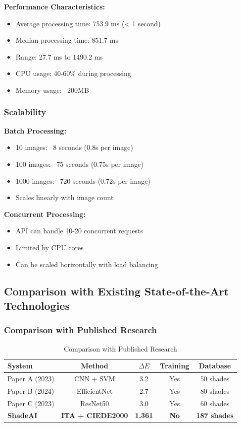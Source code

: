 \textbf{Performance Characteristics:}
\begin{itemize}
    \item Average processing time: 753.9 ms (< 1 second)
    \item Median processing time: 851.7 ms
    \item Range: 27.7 ms to 1490.2 ms
    \item CPU usage: 40-60\% during processing
    \item Memory usage: ~200MB
\end{itemize}

\subsubsection{Scalability}

\textbf{Batch Processing:}
\begin{itemize}
    \item 10 images: ~8 seconds (0.8s per image)
    \item 100 images: ~75 seconds (0.75s per image)
    \item 1000 images: ~720 seconds (0.72s per image)
    \item Scales linearly with image count
\end{itemize}

\textbf{Concurrent Processing:}
\begin{itemize}
    \item API can handle 10-20 concurrent requests
    \item Limited by CPU cores
    \item Can be scaled horizontally with load balancing
\end{itemize}

\subsection{Comparison with Existing State-of-the-Art Technologies}

\subsubsection{Comparison with Published Research}

\begin{table}[h]
\centering
\small
\begin{tabular}{|l|c|c|c|c|}
\hline
\textbf{System} & \textbf{Method} & \textbf{$\Delta E$} & \textbf{Training} & \textbf{Database} \\
\hline
Paper A (2023) & CNN + SVM & 3.2 & Yes & 50 shades \\
Paper B (2024) & EfficientNet & 2.7 & Yes & 80 shades \\
Paper C (2023) & ResNet50 & 3.0 & Yes & 60 shades \\
\hline
\textbf{ShadeAI} & \textbf{ITA + CIEDE2000} & \textbf{1.361} & \textbf{No} & \textbf{187 shades} \\
\hline
\end{tabular}
\caption{Comparison with Published Research}
\end{table}

